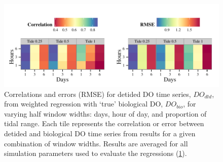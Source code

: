 \documentclass[letterpaper,12pt,oneside]{article}\usepackage[]{graphicx}\usepackage[]{color}
\makeatletter
\def\maxwidth{ %
  \ifdim\Gin@nat@width>\linewidth
    \linewidth
  \else
    \Gin@nat@width
  \fi
}
\newenvironment{knitrout}{}{} %
\makeatother
\begin{document}
\centering\vspace*{\fill}
\begin{knitrout}
\color{fgcolor}\begin{figure}[!ht]


{\centering \includegraphics[width=\maxwidth]{figure/err_surf2} 

}

\caption[Correlations and errors (\ac{RMSE}) for detided \ac{DO} time series, $DO_{dtd}$, from weighted regression with `true' biological \ac{DO}, $DO_{bio}$, for varying half window widths]{Correlations and errors (\ac{RMSE}) for detided \ac{DO} time series, $DO_{dtd}$, from weighted regression with `true' biological \ac{DO}, $DO_{bio}$, for varying half window widths: days, hour of day, and proportion of tidal range.  Each tile represents the correlation or error between detided and biological \ac{DO} time series from results for a given combination of window widths.  Results are averaged for all simulation parameters used to evaluate the regressions (\cref{fig:err_surf2}).\label{fig:err_surf2}}
\end{figure}


\end{knitrout}
\vfill
\clearpage
\end{document}

